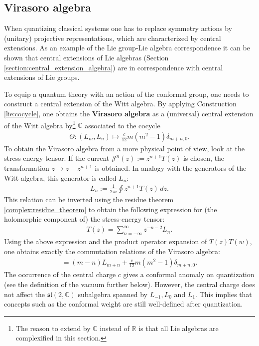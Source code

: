 \subsection{Virasoro algebra}

    When quantizing classical systems one has to replace symmetry actions by (unitary) projective representations, which are characterized by central extensions. As an example of the Lie group-Lie algebra correspondence it can be shown that central extensions of Lie algebras (Section \ref{section:central_extension_algebra}) are in correspondence with central extensions of Lie groups.

    To equip a quantum theory with an action of the conformal group, one needs to construct a central extension of the Witt algebra. By applying Construction \ref{lie:cocycle}, one obtains the \textbf{Virasoro algebra} as a (universal) central extension of the Witt algebra by\footnote{The reason to extend by $\mathbb{C}$ instead of $\mathbb{R}$ is that all Lie algebras are complexified in this section.} $\mathbb{C}$ associated to the cocycle
    \begin{gather}
        \Theta:(L_m,L_n)\mapsto\frac{c}{12}m(m^2-1)\delta_{m+n,0}.
    \end{gather}
    To obtain the Virasoro algebra from a more physical point of view, look at the stress-energy tensor. If the current $\mathcal{J}^n(z) := z^{n+1}T(z)$ is chosen, the transformation $z\longrightarrow z-z^{n+1}$ is obtained. In analogy with the generators of the Witt algebra, this generator is called $L_n$:
    \begin{gather}
        L_n := \frac{1}{2\pi i}\oint z^{n+1}T(z)\,dz.
    \end{gather}
    This relation can be inverted using the residue theorem \ref{complex:residue_theorem} to obtain the following expression for (the holomorphic component of) the stress-energy tensor:
    \begin{gather}
        T(z) = \sum_{n=-\infty}^\infty z^{-n-2}L_n.
    \end{gather}
    Using the above expression and the product operator expansion of $T(z)T(w)$, one obtains exactly the commutation relations of the Virasoro algebra:
    \begin{gather}
        [L_m,L_n] = (m-n)L_{m+n} + \frac{c}{12}m(m^2-1)\delta_{m+n,0}.
    \end{gather}
    The occurrence of the central charge $c$ gives a conformal anomaly on quantization (see the definition of the vacuum further below). However, the central charge does not affect the $\mathfrak{sl}(2,\mathbb{C})$ subalgebra spanned by $L_{-1},L_0$ and $L_1$. This implies that concepts such as the conformal weight are still well-defined after quantization.

